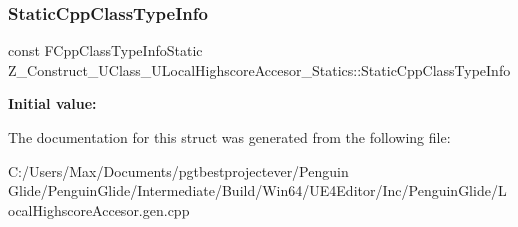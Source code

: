 \subsubsection{\texorpdfstring{StaticCppClassTypeInfo}{StaticCppClassTypeInfo}}
{\footnotesize\ttfamily const F\+Cpp\+Class\+Type\+Info\+Static Z\+\_\+\+Construct\+\_\+\+U\+Class\+\_\+\+U\+Local\+Highscore\+Accesor\+\_\+\+Statics\+::\+Static\+Cpp\+Class\+Type\+Info\hspace{0.3cm}{\ttfamily [static]}}

{\bfseries Initial value\+:}
\begin{DoxyCode}{0}
\DoxyCodeLine{= \{}
\DoxyCodeLine{    \}}

\end{DoxyCode}


The documentation for this struct was generated from the following file\+:\begin{DoxyCompactItemize}
\item 
C\+:/\+Users/\+Max/\+Documents/pgtbestprojectever/\+Penguin Glide/\+Penguin\+Glide/\+Intermediate/\+Build/\+Win64/\+U\+E4\+Editor/\+Inc/\+Penguin\+Glide/Local\+Highscore\+Accesor.\+gen.\+cpp\end{DoxyCompactItemize}
